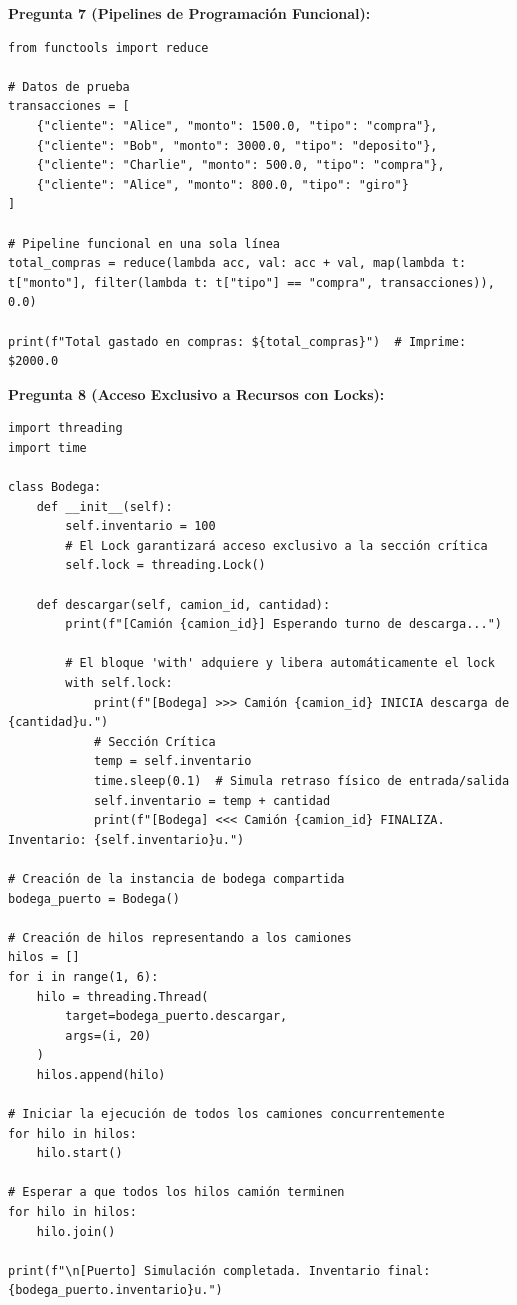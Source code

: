 \documentclass[12pt,letterpaper]{article}
\begin{document}
\bigskip

\textbf{Pregunta 7 (Pipelines de Programación Funcional):}
\begin{verbatim}
from functools import reduce

# Datos de prueba
transacciones = [
    {"cliente": "Alice", "monto": 1500.0, "tipo": "compra"},
    {"cliente": "Bob", "monto": 3000.0, "tipo": "deposito"},
    {"cliente": "Charlie", "monto": 500.0, "tipo": "compra"},
    {"cliente": "Alice", "monto": 800.0, "tipo": "giro"}
]

# Pipeline funcional en una sola línea
total_compras = reduce(lambda acc, val: acc + val, map(lambda t: t["monto"], filter(lambda t: t["tipo"] == "compra", transacciones)), 0.0)

print(f"Total gastado en compras: ${total_compras}")  # Imprime: $2000.0
\end{verbatim}

\pagebreak

\textbf{Pregunta 8 (Acceso Exclusivo a Recursos con Locks):}
\begin{verbatim}
import threading
import time

class Bodega:
    def __init__(self):
        self.inventario = 100
        # El Lock garantizará acceso exclusivo a la sección crítica
        self.lock = threading.Lock()

    def descargar(self, camion_id, cantidad):
        print(f"[Camión {camion_id}] Esperando turno de descarga...")
        
        # El bloque 'with' adquiere y libera automáticamente el lock
        with self.lock:
            print(f"[Bodega] >>> Camión {camion_id} INICIA descarga de {cantidad}u.")
            # Sección Crítica
            temp = self.inventario
            time.sleep(0.1)  # Simula retraso físico de entrada/salida
            self.inventario = temp + cantidad
            print(f"[Bodega] <<< Camión {camion_id} FINALIZA. Inventario: {self.inventario}u.")

# Creación de la instancia de bodega compartida
bodega_puerto = Bodega()

# Creación de hilos representando a los camiones
hilos = []
for i in range(1, 6):
    hilo = threading.Thread(
        target=bodega_puerto.descargar, 
        args=(i, 20)
    )
    hilos.append(hilo)

# Iniciar la ejecución de todos los camiones concurrentemente
for hilo in hilos:
    hilo.start()

# Esperar a que todos los hilos camión terminen
for hilo in hilos:
    hilo.join()

print(f"\n[Puerto] Simulación completada. Inventario final: {bodega_puerto.inventario}u.")
\end{verbatim}
\end{document}
